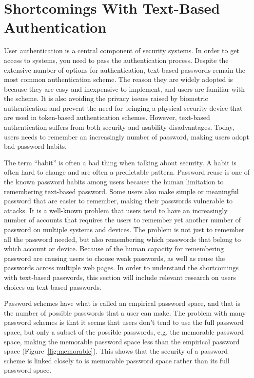   \section{Shortcomings With Text-Based Authentication} \label{sec:shortcomings}

  User authentication is a central component of security systems. In order to get access to systems, you need to pass the authentication process. Despite the extensive number of options for authentication, text-based passwords remain the most common authentication scheme. The reason they are widely adopted is because they are easy and inexpensive to implement, and users are familiar with the scheme. It is also avoiding the privacy issues raised by biometric authentication and prevent the need for bringing a physical security device that are used in token-based authentication schemes. However, text-based authentication suffers from both security and usability disadvantages. Today, users needs to remember an increasingly number of password, making users adopt bad password habits.

  The term ``habit'' is often a bad thing when talking about security. A habit is often hard to change and are often a predictable pattern. Password reuse is one of the known password habits among users because the human limitation to remembering text-based password. Some users also make simple or meaningful password that are easier to remember, making their passwords vulnerable to attacks. It is a well-known problem that users tend to have an increasingly number of accounts that requires the users to remember yet another number of password on multiple systems and devices. The problem is not just to remember all the password needed, but also remembering which passwords that belong to which account or device. Because of the human capacity for remembering password are causing users to choose weak passwords, as well as reuse the passwords across multiple web pages. In order to understand the shortcomings with text-based passwords, this section will include relevant research on users choices on text-based passwords.

  Password schemes have what is called an empirical password space, and that is the number of possible passwords that a user can make. The problem with many password schemes is that it seems that users don't tend to use the full password space, but only a subset of the possible passwords, e.g. the memorable password space, making the memorable password space less than the empirical password space (Figure~\ref{fig:memorable}). This shows that the security of a password scheme is linked closely to is memorable password space rather than its full password space.

